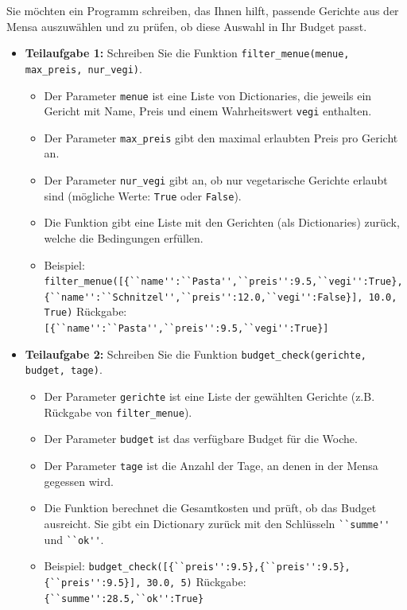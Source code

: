 \begin{myexercise}

	Sie möchten ein Programm schreiben, das Ihnen hilft, passende Gerichte aus der Mensa auszuwählen und zu prüfen, ob diese Auswahl in Ihr Budget passt.

	\begin{itemize}
		\item \textbf{Teilaufgabe 1:} Schreiben Sie die Funktion \lstinline{filter_menue(menue, max_preis, nur_vegi)}.
		      \begin{itemize}
			      \item Der Parameter \lstinline{menue} ist eine Liste von Dictionaries, die jeweils ein Gericht mit Name, Preis und einem Wahrheitswert \lstinline{vegi} enthalten.
			      \item Der Parameter \lstinline{max_preis} gibt den maximal erlaubten Preis pro Gericht an.
			      \item Der Parameter \lstinline{nur_vegi} gibt an, ob nur vegetarische Gerichte erlaubt sind (mögliche Werte: \lstinline{True} oder \lstinline{False}).
			      \item Die Funktion gibt eine Liste mit den Gerichten (als Dictionaries) zurück, welche die Bedingungen erfüllen.
			      \item Beispiel: \lstinline|filter_menue([{``name'':``Pasta'',``preis'':9.5,``vegi'':True},{``name'':``Schnitzel'',``preis'':12.0,``vegi'':False}], 10.0, True)|
			            \newline Rückgabe: \lstinline|[{``name'':``Pasta'',``preis'':9.5,``vegi'':True}]|
		      \end{itemize}

		\item \textbf{Teilaufgabe 2:} Schreiben Sie die Funktion \lstinline{budget_check(gerichte, budget, tage)}.
		      \begin{itemize}
			      \item Der Parameter \lstinline{gerichte} ist eine Liste der gewählten Gerichte (z.B. Rückgabe von \lstinline{filter_menue}).
			      \item Der Parameter \lstinline{budget} ist das verfügbare Budget für die Woche.
			      \item Der Parameter \lstinline{tage} ist die Anzahl der Tage, an denen in der Mensa gegessen wird.
			      \item Die Funktion berechnet die Gesamtkosten und prüft, ob das Budget ausreicht. Sie gibt ein Dictionary zurück mit den Schlüsseln \lstinline{``summe''} und \lstinline{``ok''}.
			      \item Beispiel: \lstinline|budget_check([{``preis'':9.5},{``preis'':9.5},{``preis'':9.5}], 30.0, 5)|
			            \newline Rückgabe: \lstinline|{``summe'':28.5,``ok'':True}|
		      \end{itemize}
	\end{itemize}


\end{myexercise}
